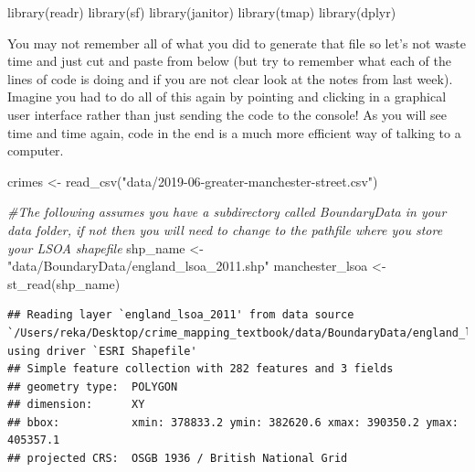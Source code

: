 \documentclass[
]{book}
\newenvironment{Shaded}{\begin{snugshade}}{\end{snugshade}}
\newcommand{\CommentTok}[1]{\textcolor[rgb]{0.56,0.35,0.01}{\textit{#1}}}
\newcommand{\FunctionTok}[1]{\textcolor[rgb]{0.00,0.00,0.00}{#1}}
\newcommand{\NormalTok}[1]{#1}
\newcommand{\OtherTok}[1]{\textcolor[rgb]{0.56,0.35,0.01}{#1}}
\newcommand{\StringTok}[1]{\textcolor[rgb]{0.31,0.60,0.02}{#1}}
\begin{document}
\begin{Shaded}
\begin{Highlighting}[]
\FunctionTok{library}\NormalTok{(readr)}
\FunctionTok{library}\NormalTok{(sf)}
\FunctionTok{library}\NormalTok{(janitor)}
\FunctionTok{library}\NormalTok{(tmap)}
\FunctionTok{library}\NormalTok{(dplyr)}
\end{Highlighting}
\end{Shaded}

You may not remember all of what you did to generate that file so let's not waste time and just cut and paste from below (but try to remember what each of the lines of code is doing and if you are not clear look at the notes from last week). Imagine you had to do all of this again by pointing and clicking in a graphical user interface rather than just sending the code to the console! As you will see time and time again, code in the end is a much more efficient way of talking to a computer.

\begin{Shaded}
\begin{Highlighting}[]
\NormalTok{crimes }\OtherTok{\textless{}{-}} \FunctionTok{read\_csv}\NormalTok{(}\StringTok{"data/2019{-}06{-}greater{-}manchester{-}street.csv"}\NormalTok{)}

\CommentTok{\#The following assumes you have a subdirectory called BoundaryData in your data folder, if not then you will need to change to the pathfile where you store your LSOA shapefile}
\NormalTok{shp\_name }\OtherTok{\textless{}{-}} \StringTok{"data/BoundaryData/england\_lsoa\_2011.shp"}
\NormalTok{manchester\_lsoa }\OtherTok{\textless{}{-}} \FunctionTok{st\_read}\NormalTok{(shp\_name)}
\end{Highlighting}
\end{Shaded}

\begin{verbatim}
## Reading layer `england_lsoa_2011' from data source `/Users/reka/Desktop/crime_mapping_textbook/data/BoundaryData/england_lsoa_2011.shp' using driver `ESRI Shapefile'
## Simple feature collection with 282 features and 3 fields
## geometry type:  POLYGON
## dimension:      XY
## bbox:           xmin: 378833.2 ymin: 382620.6 xmax: 390350.2 ymax: 405357.1
## projected CRS:  OSGB 1936 / British National Grid
\end{verbatim}
\end{document}
